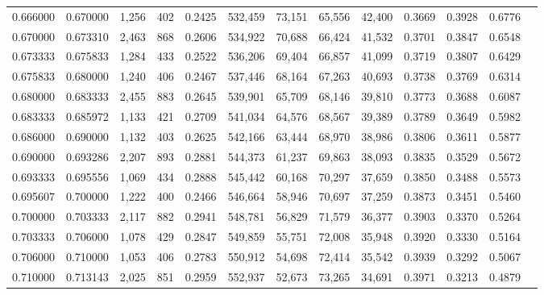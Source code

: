 \begin{tabular}{rrrrrrrrrrrrr}
0.666000 & 0.670000 &  1,256 &   402 &                                     0.2425 & 532,459 &  73,151 &  65,556 &  42,400 & 0.3669 & 0.3928 & 0.6776 \\
0.670000 & 0.673310 &  2,463 &   868 &                                     0.2606 & 534,922 &  70,688 &  66,424 &  41,532 & 0.3701 & 0.3847 & 0.6548 \\
0.673333 & 0.675833 &  1,284 &   433 &                                     0.2522 & 536,206 &  69,404 &  66,857 &  41,099 & 0.3719 & 0.3807 & 0.6429 \\
0.675833 & 0.680000 &  1,240 &   406 &                                     0.2467 & 537,446 &  68,164 &  67,263 &  40,693 & 0.3738 & 0.3769 & 0.6314 \\
0.680000 & 0.683333 &  2,455 &   883 &                                     0.2645 & 539,901 &  65,709 &  68,146 &  39,810 & 0.3773 & 0.3688 & 0.6087 \\
0.683333 & 0.685972 &  1,133 &   421 &                                     0.2709 & 541,034 &  64,576 &  68,567 &  39,389 & 0.3789 & 0.3649 & 0.5982 \\
0.686000 & 0.690000 &  1,132 &   403 &                                     0.2625 & 542,166 &  63,444 &  68,970 &  38,986 & 0.3806 & 0.3611 & 0.5877 \\
0.690000 & 0.693286 &  2,207 &   893 &                                     0.2881 & 544,373 &  61,237 &  69,863 &  38,093 & 0.3835 & 0.3529 & 0.5672 \\
0.693333 & 0.695556 &  1,069 &   434 &                                     0.2888 & 545,442 &  60,168 &  70,297 &  37,659 & 0.3850 & 0.3488 & 0.5573 \\
0.695607 & 0.700000 &  1,222 &   400 &                                     0.2466 & 546,664 &  58,946 &  70,697 &  37,259 & 0.3873 & 0.3451 & 0.5460 \\
0.700000 & 0.703333 &  2,117 &   882 &                                     0.2941 & 548,781 &  56,829 &  71,579 &  36,377 & 0.3903 & 0.3370 & 0.5264 \\
0.703333 & 0.706000 &  1,078 &   429 &                                     0.2847 & 549,859 &  55,751 &  72,008 &  35,948 & 0.3920 & 0.3330 & 0.5164 \\
0.706000 & 0.710000 &  1,053 &   406 &                                     0.2783 & 550,912 &  54,698 &  72,414 &  35,542 & 0.3939 & 0.3292 & 0.5067 \\
0.710000 & 0.713143 &  2,025 &   851 &                                     0.2959 & 552,937 &  52,673 &  73,265 &  34,691 & 0.3971 & 0.3213 & 0.4879 \\

\end{tabular}
